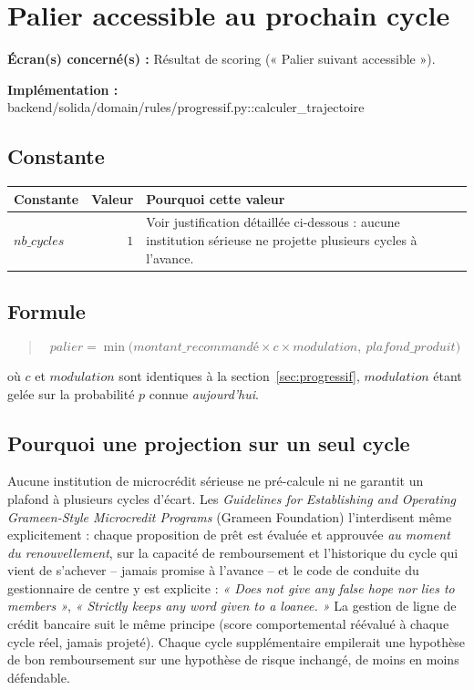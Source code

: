 \documentclass[11pt,a4paper]{article}
\newcommand{\brk}{\allowbreak}
\newcommand{\ecran}[1]{\noindent\textbf{Écran(s) concerné(s) :} #1\par}
\newcommand{\fichier}[1]{\noindent\textbf{Implémentation :} \tiny\ttfamily#1\normalfont\normalsize\par}
\newenvironment{formule}{\begin{quote}}{\end{quote}}
\begin{document}
\section{Palier accessible au prochain cycle}
\label{sec:trajectoire}

\ecran{Résultat de scoring (« Palier suivant accessible »).}
\fichier{backend/\brk solida/\brk domain/\brk rules/\brk progressif.py::\brk{}calculer\_trajectoire}

\subsection*{Constante}

\begin{tabular}{@{}L{3.2cm}rL{6.9cm}@{}}
\toprule
Constante & Valeur & Pourquoi cette valeur \\
\midrule
$\mathit{nb\_cycles}$ & $1$ & Voir justification détaillée ci-dessous : aucune institution
  sérieuse ne projette plusieurs cycles à l'avance. \\
\bottomrule
\end{tabular}

\subsection*{Formule}
\begin{formule}
\[
\mathit{palier} = \min\big(\mathit{montant\_recommandé} \times c \times \mathit{modulation},\ \mathit{plafond\_produit}\big)
\]
\end{formule}
où $c$ et $\mathit{modulation}$ sont identiques à la section~\ref{sec:progressif},
$\mathit{modulation}$ étant gelée sur la probabilité $p$ connue \emph{aujourd'hui}.

\subsection*{Pourquoi une projection sur un seul cycle}
Aucune institution de microcrédit sérieuse ne pré-calcule ni ne garantit un plafond à plusieurs
cycles d'écart. Les \emph{Guidelines for Establishing and Operating Grameen-Style Microcredit
Programs} (Grameen Foundation) l'interdisent même explicitement : chaque proposition de prêt est
évaluée et approuvée \emph{au moment du renouvellement}, sur la capacité de remboursement et
l'historique du cycle qui vient de s'achever -- jamais promise à l'avance -- et le code de
conduite du gestionnaire de centre y est explicite : \emph{« Does not give any false hope nor
lies to members »}, \emph{« Strictly keeps any word given to a loanee. »} La gestion de ligne de
crédit bancaire suit le même principe (score comportemental réévalué à chaque cycle réel, jamais
projeté). Chaque cycle supplémentaire empilerait une hypothèse de bon remboursement sur une
hypothèse de risque inchangé, de moins en moins défendable.
\end{document}
